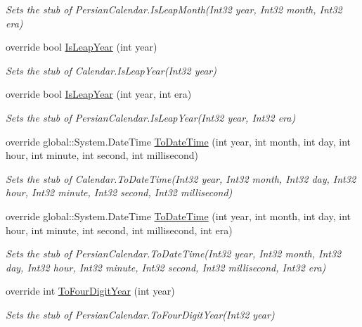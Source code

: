 \begin{DoxyCompactItemize}
\begin{DoxyCompactList}\small\item\em Sets the stub of Persian\-Calendar.\-Is\-Leap\-Month(\-Int32 year, Int32 month, Int32 era)\end{DoxyCompactList}\item 
override bool \hyperlink{class_system_1_1_globalization_1_1_fakes_1_1_stub_persian_calendar_a5592b999d912475a0ac6b26e383b5497}{Is\-Leap\-Year} (int year)
\begin{DoxyCompactList}\small\item\em Sets the stub of Calendar.\-Is\-Leap\-Year(\-Int32 year)\end{DoxyCompactList}\item 
override bool \hyperlink{class_system_1_1_globalization_1_1_fakes_1_1_stub_persian_calendar_ab83f67f45e3ad23bdb7acee0810b02ce}{Is\-Leap\-Year} (int year, int era)
\begin{DoxyCompactList}\small\item\em Sets the stub of Persian\-Calendar.\-Is\-Leap\-Year(\-Int32 year, Int32 era)\end{DoxyCompactList}\item 
override global\-::\-System.\-Date\-Time \hyperlink{class_system_1_1_globalization_1_1_fakes_1_1_stub_persian_calendar_a044ad40b32e15c2e50412a370b789cdc}{To\-Date\-Time} (int year, int month, int day, int hour, int minute, int second, int millisecond)
\begin{DoxyCompactList}\small\item\em Sets the stub of Calendar.\-To\-Date\-Time(\-Int32 year, Int32 month, Int32 day, Int32 hour, Int32 minute, Int32 second, Int32 millisecond)\end{DoxyCompactList}\item 
override global\-::\-System.\-Date\-Time \hyperlink{class_system_1_1_globalization_1_1_fakes_1_1_stub_persian_calendar_a8d05d45fc0aea8a4d341bdaeefb4f780}{To\-Date\-Time} (int year, int month, int day, int hour, int minute, int second, int millisecond, int era)
\begin{DoxyCompactList}\small\item\em Sets the stub of Persian\-Calendar.\-To\-Date\-Time(\-Int32 year, Int32 month, Int32 day, Int32 hour, Int32 minute, Int32 second, Int32 millisecond, Int32 era)\end{DoxyCompactList}\item 
override int \hyperlink{class_system_1_1_globalization_1_1_fakes_1_1_stub_persian_calendar_aabe26f754584a509aec18339b9d34338}{To\-Four\-Digit\-Year} (int year)
\begin{DoxyCompactList}\small\item\em Sets the stub of Persian\-Calendar.\-To\-Four\-Digit\-Year(\-Int32 year)\end{DoxyCompactList}\end{DoxyCompactItemize}
